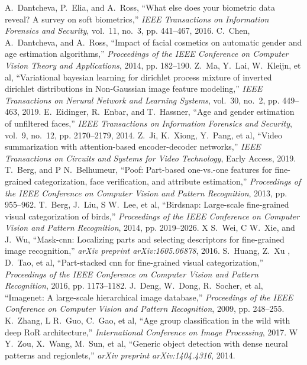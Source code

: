 \documentclass[journal]{IEEEtran}
\begin{document}
\begin{thebibliography}{1}
A.~Dantcheva, P.~Elia, and A.~Ross, ``What else does your biometric data reveal? A survey on soft biometrics,'' \emph{IEEE Transactions on Information Forensics and Security}, vol.~11, no.~3, pp. 441--467, 2016.
C.~Chen, A.~Dantcheva, and A.~Ross, ``Impact of facial cosmetics on automatic gender and age estimation algorithms,'' \emph{Proceedings of the IEEE Conference on Computer Vision Theory and Applications}, 2014, pp. 182--190.
Z.~Ma, Y.~Lai, W.~Kleijn, et al, ``Variational bayesian learning for dirichlet process mixture of inverted dirichlet distributions in Non-Gaussian image feature modeling,'' \emph{IEEE Transactions on Nerural Network and Learning Systems}, vol.~30, no.~2, pp. 449--463, 2019.
E.~Eidinger, R.~Enbar, and T.~Hassner, ``Age and gender estimation of unfiltered faces,'' \emph{IEEE Transactions on Information Forensics and Security}, vol.~9, no.~12, pp. 2170--2179, 2014.
Z.~Ji, K.~Xiong, Y.~Pang, et al, ``Video summarization with attention-based encoder-decoder networks,'' \emph{IEEE Transactions on Circuits and Systems for Video Technology}, Early Access, 2019.
T.~Berg, and P N.~Belhumeur, ``Poof: Part-based one-vs.-one features for fine-grained categorization, face verification, and attribute estimation,'' \emph{Proceedings of the IEEE Conference on Computer Vision and Pattern Recognition}, 2013, pp. 955--962.
T.~Berg, J.~Liu, S W.~Lee, et al, ``Birdsnap: Large-scale fine-grained visual categorization of birds,'' \emph{Proceedings of the IEEE Conference on Computer Vision and Pattern Recognition}, 2014, pp. 2019--2026.
X S.~Wei, C W.~Xie, and J.~Wu, ``Mask-cnn: Localizing parts and selecting descriptors for fine-grained image recognition,'' \emph{arXiv preprint arXiv:1605.06878}, 2016.
S.~Huang, Z.~Xu , D.~Tao, et al, ``Part-stacked cnn for fine-grained visual categorization,'' \emph{Proceedings of the IEEE Conference on Computer Vision and Pattern Recognition}, 2016, pp. 1173--1182.
J.~Deng, W.~Dong, R.~Socher, et al, ``Imagenet: A large-scale hierarchical image database,'' \emph{Proceedings of the IEEE Conference on Computer Vision and Pattern Recognition}, 2009, pp. 248--255.
K.~Zhang, L R.~Guo, C.~Gao, et al, ``Age group classification in the wild with deep RoR architecture,'' \emph{International Conference on Image Processing}, 2017.
W Y.~Zou, X.~Wang, M.~Sun, et al, ``Generic object detection with dense neural patterns and regionlets,'' \emph{arXiv preprint arXiv:1404.4316}, 2014.

\end{thebibliography}
\end{document}
